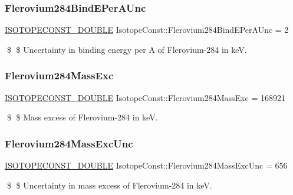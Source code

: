 \subsubsection{\texorpdfstring{Flerovium284\+Bind\+E\+Per\+A\+Unc}{Flerovium284BindEPerAUnc}}
{\footnotesize\ttfamily \mbox{\hyperlink{group___isotope_const-_macros_ga8f45a7272ce02c0b4c65c44636ed719a}{I\+S\+O\+T\+O\+P\+E\+C\+O\+N\+S\+T\+\_\+\+D\+O\+U\+B\+LE}} Isotope\+Const\+::\+Flerovium284\+Bind\+E\+Per\+A\+Unc = 2}

\$ \$ Uncertainty in binding energy per A of Flerovium-\/284 in keV. \mbox{\label{group___isotope_const-_flerovium-_fl284_ga8f055cf476ef1076832d9eaa5c89f930}} 
\subsubsection{\texorpdfstring{Flerovium284\+Mass\+Exc}{Flerovium284MassExc}}
{\footnotesize\ttfamily \mbox{\hyperlink{group___isotope_const-_macros_ga8f45a7272ce02c0b4c65c44636ed719a}{I\+S\+O\+T\+O\+P\+E\+C\+O\+N\+S\+T\+\_\+\+D\+O\+U\+B\+LE}} Isotope\+Const\+::\+Flerovium284\+Mass\+Exc = 168921}

\$ \$ Mass excess of Flerovium-\/284 in keV. \mbox{\label{group___isotope_const-_flerovium-_fl284_ga94b4a5502e377009295505d2a5aa080a}} 
\subsubsection{\texorpdfstring{Flerovium284\+Mass\+Exc\+Unc}{Flerovium284MassExcUnc}}
{\footnotesize\ttfamily \mbox{\hyperlink{group___isotope_const-_macros_ga8f45a7272ce02c0b4c65c44636ed719a}{I\+S\+O\+T\+O\+P\+E\+C\+O\+N\+S\+T\+\_\+\+D\+O\+U\+B\+LE}} Isotope\+Const\+::\+Flerovium284\+Mass\+Exc\+Unc = 656}

\$ \$ Uncertainty in mass excess of Flerovium-\/284 in keV. \mbox{\label{group___isotope_const-_flerovium-_fl284_ga9b682d0f57593eb39d44d5af3ac9492d}} 
